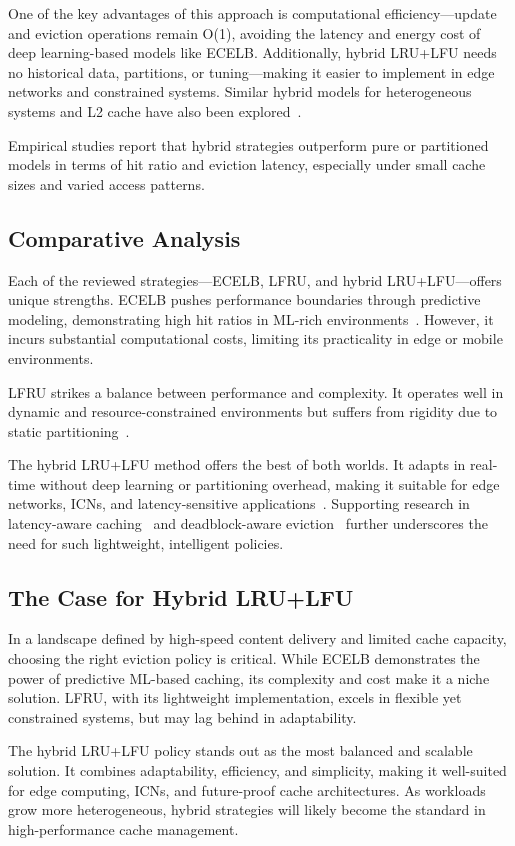One of the key advantages of this approach is computational efficiency—update and eviction operations remain O(1), avoiding the latency and energy cost of deep learning-based models like ECELB. Additionally, hybrid LRU+LFU needs no historical data, partitions, or tuning—making it easier to implement in edge networks and constrained systems. Similar hybrid models for heterogeneous systems and L2 cache have also been explored~\cite{AnandKumar2014HeterogeneousMultiCross, Lin2015HighEnduranceHybridCache}.

Empirical studies report that hybrid strategies outperform pure or partitioned models in terms of hit ratio and eviction latency, especially under small cache sizes and varied access patterns.

\subsection{Comparative Analysis}

Each of the reviewed strategies—ECELB, LFRU, and hybrid LRU+LFU—offers unique strengths. ECELB pushes performance boundaries through predictive modeling, demonstrating high hit ratios in ML-rich environments~\cite{Zhou2023CacheEviction-LearningBeladyAlgorithm}. However, it incurs substantial computational costs, limiting its practicality in edge or mobile environments.

LFRU strikes a balance between performance and complexity. It operates well in dynamic and resource-constrained environments but suffers from rigidity due to static partitioning~\cite{Bilal2017CacheManagementSchemeforEfficientContentEvictionReplication}.

The hybrid LRU+LFU method offers the best of both worlds. It adapts in real-time without deep learning or partitioning overhead, making it suitable for edge networks, ICNs, and latency-sensitive applications~\cite{shah2023ImprovedCacheEviction}. Supporting research in latency-aware caching~\cite{Saxena2024LatencyAwareDynamicCachingModel} and deadblock-aware eviction~\cite{Wu2022DeadblockAwareAdaptiveEvictionPolicy} further underscores the need for such lightweight, intelligent policies.

\subsection{The Case for Hybrid LRU+LFU}

In a landscape defined by high-speed content delivery and limited cache capacity, choosing the right eviction policy is critical. While ECELB demonstrates the power of predictive ML-based caching, its complexity and cost make it a niche solution. LFRU, with its lightweight implementation, excels in flexible yet constrained systems, but may lag behind in adaptability.

The hybrid LRU+LFU policy stands out as the most balanced and scalable solution. It combines adaptability, efficiency, and simplicity, making it well-suited for edge computing, ICNs, and future-proof cache architectures. As workloads grow more heterogeneous, hybrid strategies will likely become the standard in high-performance cache management.
